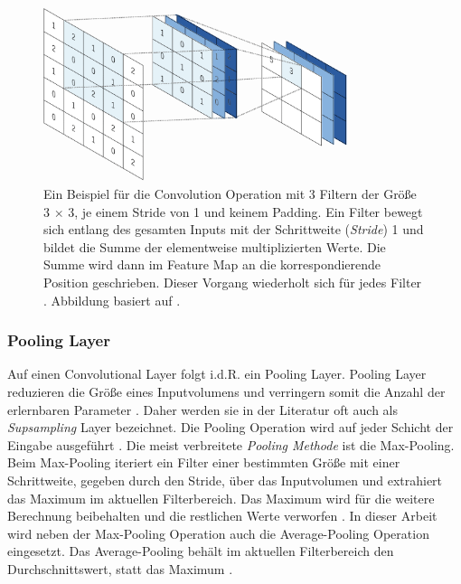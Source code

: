 \pagebreak
\vspace*{\fill}
\begin{figure}[H]
	\centering
	\includegraphics[width=0.8\textwidth]{images/ann_conv/convolution_layer.png}
	\caption{Ein Beispiel für die Convolution Operation mit 3 Filtern der Größe 3 $\times$ 3, je einem Stride von 1 und keinem Padding. Ein Filter bewegt sich entlang des gesamten Inputs mit der Schrittweite (\textit{Stride}) 1 und bildet die Summe der elementweise multiplizierten Werte. Die Summe wird dann im Feature Map an die korrespondierende Position geschrieben. Dieser Vorgang wiederholt sich für jedes Filter \cite{yamashitaConvolutionalNeuralNetworks2018}. Abbildung basiert auf \cite{yamashitaConvolutionalNeuralNetworks2018}.}
	\label{fig:convolution_layer}
\end{figure}
\vspace*{\fill}
\pagebreak
\subsubsection{Pooling Layer}
Auf einen Convolutional Layer folgt i.d.R. ein Pooling Layer. Pooling Layer reduzieren die Größe eines Inputvolumens und verringern somit die Anzahl der erlernbaren Parameter \cite{CS231nConvolutionalNeurala}. Daher werden sie in der Literatur oft auch als \textit{Supsampling} Layer bezeichnet. Die Pooling Operation wird auf jeder Schicht der Eingabe ausgeführt \cite{CS231nConvolutionalNeurala}. Die meist verbreitete \textit{Pooling Methode} ist die Max-Pooling. Beim Max-Pooling iteriert ein Filter einer bestimmten Größe mit einer Schrittweite, gegeben durch den Stride, über das Inputvolumen und extrahiert das Maximum im aktuellen Filterbereich. Das Maximum wird für die weitere Berechnung beibehalten und die restlichen Werte verworfen
 \cite{CS231nConvolutionalNeurala}. In dieser Arbeit wird neben der Max-Pooling Operation auch die Average-Pooling Operation eingesetzt. Das Average-Pooling behält im aktuellen Filterbereich den Durchschnittswert, statt das Maximum \cite{CS231nConvolutionalNeurala}.
 
